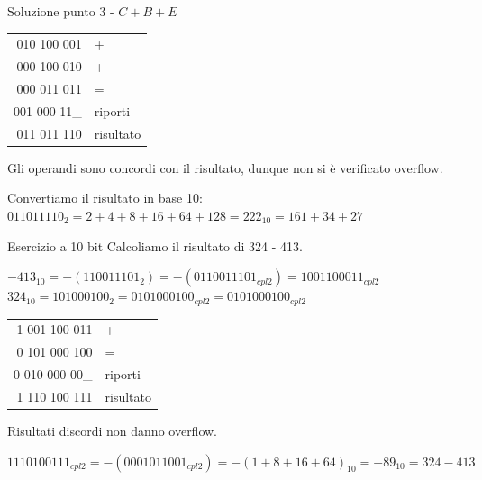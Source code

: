 \documentclass[9pt, handout]{beamer}
\begin{document}
\begin{frame}{Soluzione punto 3 - $C+B+E$}
\begin{tabular}{r|l}
	010 100 001 & + \\
	000 100 010 & + \\
	000 011 011 &	=	\\
	\hline
	001 000 11\_&	riporti\\
	011 011 110	& risultato
\end{tabular}

\pause
Gli operandi sono concordi con il risultato, dunque non si è verificato overflow.

\pause
Convertiamo il risultato in base 10: $011011110_2 = 2+4+8+16+64+128 = 222_{10} = 161+34+27$
\end{frame}

\begin{frame}{Esercizio a 10 bit}
Calcoliamo il risultato di 324 - 413.

\pause
$-413_{10} = -(110011101_2) = -(0110011101_{cpl2}) = 1001100011_{cpl2}$\\
$324_{10} = 101000100_2 = 0101000100_{cpl2}        = 0101000100_{cpl2}$

\pause
\begin{tabular}{r|l}
	1 001 100 011 & + \\
	0 101 000 100 & = \\
	\hline
	0 010 000 00\_&	riporti\\
    1 110 100 111 & risultato
\end{tabular}

\pause
Risultati discordi non danno overflow.

\pause
$1110100111_{cpl2} = -(0001011001_{cpl2}) = -(1+8+16+64)_{10} = -89_{10} = 324-413$
\end{frame}
\end{document}
